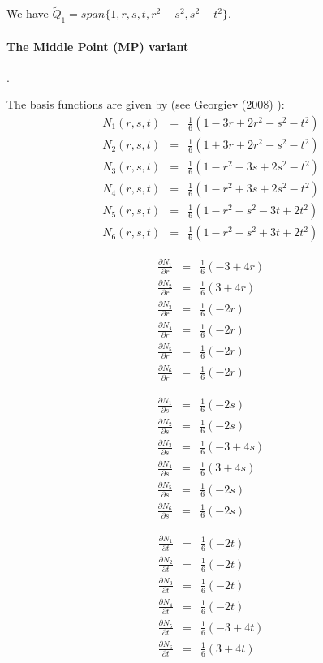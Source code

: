We have $\tilde{Q}_1=span \{1,r,s,t,r^2-s^2,s^2-t^2\}$.

\paragraph{The Middle Point (MP) variant}. 

The basis functions are given by (see Georgiev \etal (2008) \cite{gekm08}):
\begin{eqnarray}
N_1(r,s,t) &=& \frac{1}{6}(1-3r+2r^2-s^2-t^2 ) \\
N_2(r,s,t) &=& \frac{1}{6}(1+3r+2r^2-s^2-t^2 ) \\
N_3(r,s,t) &=& \frac{1}{6}(1-r^2-3s+2s^2-t^2 ) \\
N_4(r,s,t) &=& \frac{1}{6}(1-r^2+3s+2s^2-t^2 ) \\
N_5(r,s,t) &=& \frac{1}{6}(1-r^2-s^2-3t+2t^2 ) \\
N_6(r,s,t) &=& \frac{1}{6}(1-r^2-s^2+3t+2t^2 ) 
\end{eqnarray}

\begin{eqnarray}
\frac{\partial N_1}{\partial r} &=& \frac{1}{6} (-3+4r )\\
\frac{\partial N_2}{\partial r} &=& \frac{1}{6} (3+4r )\\
\frac{\partial N_3}{\partial r} &=& \frac{1}{6} (-2r) \\
\frac{\partial N_4}{\partial r} &=& \frac{1}{6} (-2r) \\
\frac{\partial N_5}{\partial r} &=& \frac{1}{6} (-2r) \\
\frac{\partial N_6}{\partial r} &=& \frac{1}{6} (-2r) 
\end{eqnarray}

\begin{eqnarray}
\frac{\partial N_1}{\partial s} &=& \frac{1}{6} (-2s)\\ 
\frac{\partial N_2}{\partial s} &=& \frac{1}{6} (-2s) \\
\frac{\partial N_3}{\partial s} &=& \frac{1}{6} (-3+4s )\\
\frac{\partial N_4}{\partial s} &=& \frac{1}{6} (3+4s )\\
\frac{\partial N_5}{\partial s} &=& \frac{1}{6} (-2s) \\
\frac{\partial N_6}{\partial s} &=& \frac{1}{6} (-2s) 
\end{eqnarray}

\begin{eqnarray}
\frac{\partial N_1}{\partial t} &=& \frac{1}{6}(-2t) \\ 
\frac{\partial N_2}{\partial t} &=& \frac{1}{6}(-2t) \\ 
\frac{\partial N_3}{\partial t} &=& \frac{1}{6}(-2t) \\ 
\frac{\partial N_4}{\partial t} &=& \frac{1}{6}(-2t) \\ 
\frac{\partial N_5}{\partial t} &=& \frac{1}{6}(-3+4t) \\ 
\frac{\partial N_6}{\partial t} &=& \frac{1}{6}(3+4t)  
\end{eqnarray}


